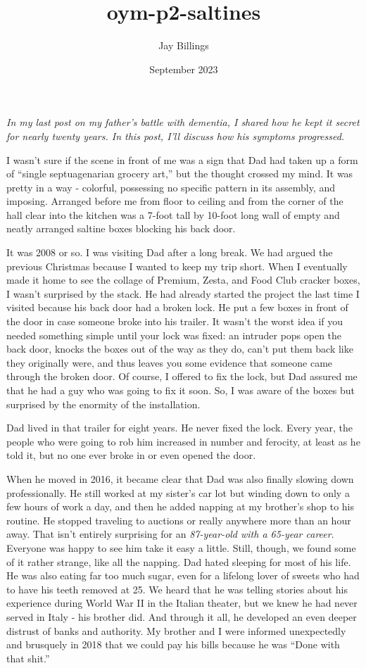 \documentclass{article}
\title{oym-p2-saltines}
\author{Jay Billings}
\date{September 2023}
\begin{document}
\maketitle

\textit{In my last post on my father's battle with dementia, I shared how he kept it secret for nearly twenty years. In this post, I'll discuss how his symptoms progressed.}

I wasn't sure if the scene in front of me was a sign that Dad had taken up a form of ``single septuagenarian grocery art,'' but the thought crossed my mind. It was pretty in a way - colorful, possessing no specific pattern in its assembly, and imposing. Arranged before me from floor to ceiling and from the corner of the hall clear into the kitchen was a 7-foot tall by 10-foot long wall of empty and neatly arranged saltine boxes blocking his back door.

It was 2008 or so. I was visiting Dad after a long break. We had argued the previous Christmas because I wanted to keep my trip short. When I eventually made it home to see the collage of Premium, Zesta, and Food Club cracker boxes, I wasn't surprised by the stack. He had already started the project the last time I visited because his back door had a broken lock. He put a few boxes in front of the door in case someone broke into his trailer. It wasn't the worst idea if you needed something simple until your lock was fixed: an intruder pops open the back door, knocks the boxes out of the way as they do, can't put them back like they originally were, and thus leaves you some evidence that someone came through the broken door. Of course, I offered to fix the lock, but Dad assured me that he had a guy who was going to fix it soon. So, I was aware of the boxes but surprised by the enormity of the installation.

Dad lived in that trailer for eight years. He never fixed the lock. Every year, the people who were going to rob him increased in number and ferocity, at least as he told it, but no one ever broke in or even opened the door.

When he moved in 2016, it became clear that Dad was also finally slowing down professionally. He still worked at my sister's car lot but winding down to only a few hours of work a day, and then he added napping at my brother's shop to his routine. He stopped traveling to auctions or really anywhere more than an hour away. That isn't entirely surprising for an \textit{87-year-old with a 65-year career}. Everyone was happy to see him take it easy a little. Still, though, we found some of it rather strange, like all the napping. Dad hated sleeping for most of his life. He was also eating far too much sugar, even for a lifelong lover of sweets who had to have his teeth removed at 25. We heard that he was telling stories about his experience during World War II in the Italian theater, but we knew he had never served in Italy - his brother did. And through it all, he developed an even deeper distrust of banks and authority. My brother and I were informed unexpectedly and brusquely in 2018 that we could pay his bills because he was ``Done with that shit.''
\end{document}
